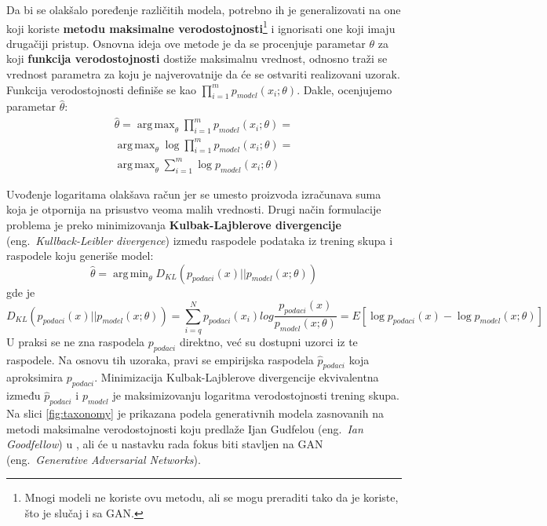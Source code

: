 \documentclass[a4paper]{article}
\DeclareMathOperator*{\argmax}{arg\,max}
\DeclareMathOperator*{\argmin}{arg\,min}
\begin{document}
Da bi se olakšalo poređenje različitih modela, potrebno ih je generalizovati na one koji koriste \textbf{metodu maksimalne verodostojnosti}\footnote{Mnogi modeli ne koriste ovu metodu, ali se mogu preraditi tako da je koriste, što je slučaj i sa GAN\cite{nipstut}.} i ignorisati one koji imaju drugačiji pristup. Osnovna ideja ove metode je da se procenjuje parametar $\theta$ za koji \textbf{funkcija verodostojnosti} dostiže maksimalnu vrednost, odnosno traži se vrednost parametra za koju je najverovatnije da će se ostvariti realizovani uzorak. Funkcija verodostojnosti definiše se kao $\prod_{i=1}^{m}p_{model}(x_i ; \theta)$. Dakle, ocenjujemo parametar $\hat{\theta}$: 
\begin{align*}
\label{eq:loglikelihood}
    \hat{\theta} =  \argmax_{\theta}\prod_{i=1}^{m}p_{model}(x_i ; \theta) =\\ \argmax_{\theta}\log\prod_{i=1}^{m}p_{model}(x_i ; \theta) =\\ \argmax_{\theta}\sum_{i=1}^{m}\log{p_{model}(x_i ; \theta)}
\end{align*}

Uvođenje logaritama olakšava račun jer se umesto proizvoda izračunava suma koja je otpornija na prisustvo veoma malih vrednosti. 
Drugi način formulacije problema je preko minimizovanja \textbf{Kulbak-Lajblerove divergencije} (eng.~{\em Kullback-Leibler divergence}) između raspodele podataka iz trening skupa i raspodele koju generiše model: 
$$ \hat{\theta} = \argmin_{\theta}D_{KL}(p_{podaci}(x)||p_{model}(x;\theta)) $$ gde je $$D_{KL}(p_{podaci}(x)||p_{model}(x;\theta)) = \sum_{i=q}^{N}p_{podaci}(x_i)log\frac{p_{podaci}(x)}{p_{model}(x;\theta)} = E[\log{p_{podaci}(x)} - \log{p_{model}(x;\theta)}]$$
U praksi se ne zna raspodela $p_{podaci}$ direktno, već su dostupni uzorci iz te raspodele. Na osnovu tih uzoraka, pravi se empirijska raspodela $\hat{p}_{podaci}$ koja aproksimira $p_{podaci}$. Minimizacija Kulbak-Lajblerove divergencije ekvivalentna između $\hat{p}_{podaci}$ i $p_{model}$  je maksimizovanju logaritma verodostojnosti trening skupa. \\ %

Na slici \ref{fig:taxonomy} je prikazana podela generativnih modela zasnovanih na metodi maksimalne verodostojnosti koju predlaže Ijan Gudfelou (eng.~{\em Ian Goodfellow}) u \cite{nipstut}, ali će u nastavku rada fokus biti stavljen na GAN (eng.~{\em Generative Adversarial Networks}).  
\end{document}
